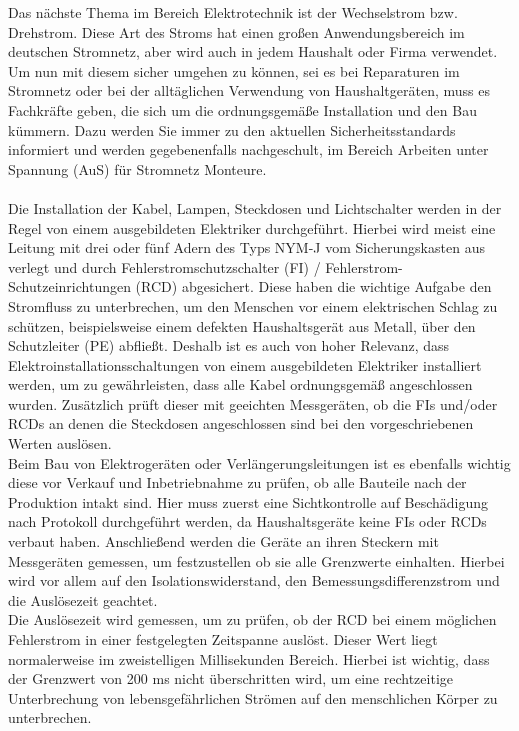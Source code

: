 Das nächste Thema im Bereich Elektrotechnik ist der Wechselstrom bzw. Drehstrom. Diese Art des Stroms hat einen großen Anwendungsbereich im deutschen 
Stromnetz, aber wird auch in jedem Haushalt oder Firma verwendet. Um nun mit diesem sicher umgehen zu können, sei es bei Reparaturen im Stromnetz oder
bei der alltäglichen Verwendung von Haushaltgeräten, muss es Fachkräfte geben, die sich um die ordnungsgemäße Installation und den Bau kümmern. 
Dazu werden Sie immer zu den aktuellen Sicherheitsstandards informiert und werden gegebenenfalls nachgeschult, \zB im Bereich Arbeiten unter Spannung (AuS) 
für Stromnetz Monteure.
\\\\
Die Installation der Kabel, 
Lampen, Steckdosen und Lichtschalter werden in der Regel von einem ausgebildeten Elektriker durchgeführt. Hierbei wird meist eine Leitung mit drei oder 
fünf Adern des Typs NYM-J vom Sicherungskasten aus verlegt und durch Fehlerstromschutzschalter (FI) / Fehlerstrom-Schutzeinrichtungen (RCD) abgesichert. 
Diese haben die wichtige Aufgabe den Stromfluss zu unterbrechen, um den Menschen vor einem elektrischen Schlag zu schützen, beispielsweise einem defekten 
Haushaltsgerät aus Metall, über den Schutzleiter (PE) abfließt. Deshalb ist es auch von hoher Relevanz, dass Elektroinstallationsschaltungen von einem 
ausgebildeten Elektriker installiert werden, um zu gewährleisten, dass alle Kabel ordnungsgemäß angeschlossen wurden. Zusätzlich prüft dieser mit geeichten 
Messgeräten, ob die FIs und/oder RCDs an denen die Steckdosen angeschlossen sind bei den vorgeschriebenen Werten auslösen.\\
Beim Bau von Elektrogeräten oder Verlängerungsleitungen ist es ebenfalls wichtig diese vor Verkauf und Inbetriebnahme zu prüfen, ob alle Bauteile nach der 
Produktion intakt sind. Hier muss zuerst eine Sichtkontrolle auf Beschädigung nach Protokoll durchgeführt 
werden, da Haushaltsgeräte keine FIs oder RCDs verbaut haben. Anschließend werden die Geräte an ihren Steckern mit Messgeräten gemessen, um festzustellen 
ob sie alle Grenzwerte einhalten. Hierbei wird vor allem auf den Isolationswiderstand, den Bemessungsdifferenzstrom und die Auslösezeit geachtet.\\
Die Auslösezeit wird gemessen, um zu prüfen, ob der RCD bei einem möglichen Fehlerstrom in einer festgelegten Zeitspanne auslöst.
Dieser Wert liegt normalerweise im zweistelligen Millisekunden Bereich. Hierbei ist wichtig, dass 
der Grenzwert von 200 ms nicht überschritten wird, um eine rechtzeitige Unterbrechung von lebensgefährlichen Strömen auf den menschlichen Körper zu
unterbrechen. \autocite{Schwab.2012} \autocite{Rudnik.2020}
\clearpage

